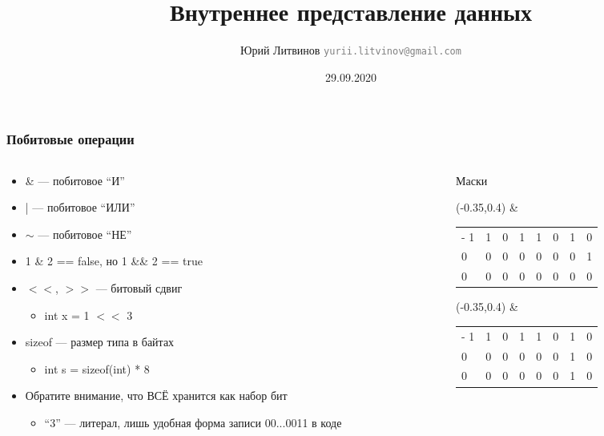 \documentclass[xetex,mathserif,serif]{beamer}
\title{Внутреннее представление данных}
\author[Юрий Литвинов]{Юрий Литвинов \newline \textcolor{gray}{\small\texttt{yurii.litvinov@gmail.com}}}
\date{29.09.2020}
\begin{document}
	
	\frame{\titlepage}
	
	\begin{frame}
		\frametitle{Побитовые операции}
		\begin{columns}
			\begin{column}{0.6\textwidth}
				\begin{itemize}
					\item \& --- побитовое ``И''
					\item | --- побитовое ``ИЛИ''
					\item $\sim$ --- побитовое ``НЕ''
					\item 1 \& 2 == false, но 1 \&\& 2 == true
					\item $<<$, $>>$ --- битовый сдвиг
					\begin{itemize}
						\item int x = 1 $<<$ 3
					\end{itemize}
					\item sizeof --- размер типа в байтах
					\begin{itemize}
						\item int s = sizeof(int) * 8
					\end{itemize}
					\item Обратите внимание, что ВСЁ хранится как набор бит
					\begin{itemize}
						\item ``3'' --- литерал, лишь удобная форма записи 00...0011 в коде
					\end{itemize}
				\end{itemize}
			\end{column}
			\begin{column}{0.4\textwidth}
				Маски
				\vspace{3mm}
				\begin{textblock}{1}(-0.35,0.4)
					\&
				\end{textblock}
				\begin{tabu} {| X[1 l p] | X[1 l p] | X[1 l p] | X[1 l p] | X[1 l p] | X[1 l p] | X[1 l p] | X[1 l p] |}
					\tabucline-
					\everyrow{\tabucline-}
					1 & 1 & 0 & 1 & 1 & 0 & 1 & 0 \\
					0 & 0 & 0 & 0 & 0 & 0 & 0 & 1 \\
					0 & 0 & 0 & 0 & 0 & 0 & 0 & 0 \\
				\end{tabu}
				\vspace{0.5cm}

				\begin{textblock}{1}(-0.35,0.4)
					\&
				\end{textblock}
				\begin{tabu} {| X[1 l p] | X[1 l p] | X[1 l p] | X[1 l p] | X[1 l p] | X[1 l p] | X[1 l p] | X[1 l p] |}
					\tabucline-
					\everyrow{\tabucline-}
					1 & 1 & 0 & 1 & 1 & 0 & 1 & 0 \\
					0 & 0 & 0 & 0 & 0 & 0 & 1 & 0 \\
					0 & 0 & 0 & 0 & 0 & 0 & 1 & 0 \\
				\end{tabu}
			\end{column}
		\end{columns}
	\end{frame}
\end{document}
